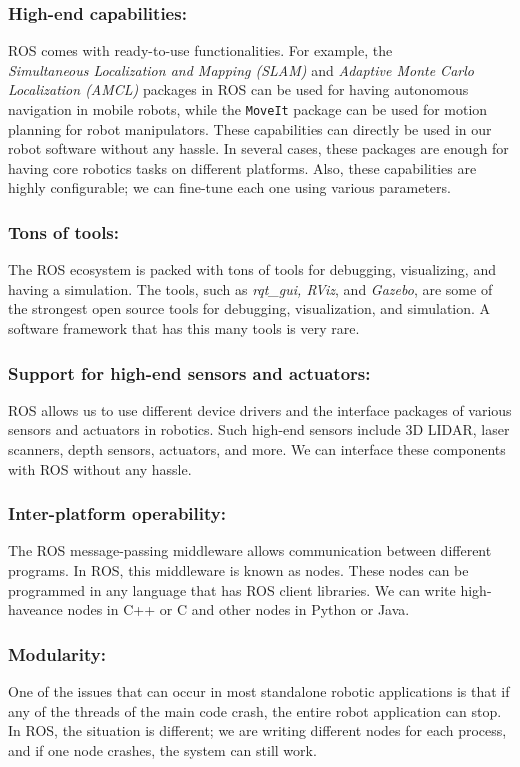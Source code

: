 \documentclass[../../main]{subfiles}
\begin{document}
\subsubsection{High-end capabilities:}ROS comes with ready-to-use functionalities. For example,
    the \\\emph{Simultaneous Localization and Mapping (SLAM)} and \emph{Adaptive Monte
    Carlo Localization (AMCL)} packages in ROS can be used for having autonomous
    navigation in mobile robots, while the \lstinline!MoveIt! package can be used for motion
    planning for robot manipulators. These capabilities can directly be used in our
    robot software without any hassle. In several cases, these packages are enough for
    having core robotics tasks on different platforms. Also, these capabilities are highly
    configurable; we can fine-tune each one using various parameters.
\subsubsection{Tons of tools:} The ROS ecosystem is packed with tons of tools for debugging,
    visualizing, and having a simulation. The tools, such as \emph{rqt\_gui, RViz}, and \emph{Gazebo},
    are some of the strongest open source tools for debugging, visualization, and
    simulation. A software framework that has this many tools is very rare.
\subsubsection{Support for high-end sensors and actuators:} ROS allows us to use different device
    drivers and the interface packages of various sensors and actuators in robotics. Such
    high-end sensors include 3D LIDAR, laser scanners, depth sensors, actuators, and
    more. We can interface these components with ROS without any hassle.
\subsubsection{Inter-platform operability:} The ROS message-passing middleware allows
    communication between different programs. In ROS, this middleware is known
    as nodes. These nodes can be programmed in any language that has ROS client
    libraries. We can write high-haveance nodes in C++ or C and other nodes in Python
    or Java.
\subsubsection{Modularity:}One of the issues that can occur in most standalone robotic
    applications is that if any of the threads of the main code crash, the entire robot
    application can stop. In ROS, the situation is different; we are writing different
    nodes for each process, and if one node crashes, the system can still work.
\end{document}
